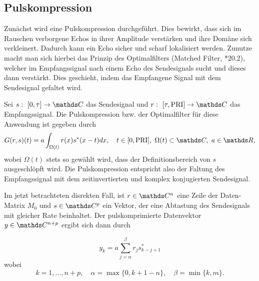 
\subsection{Pulskompression}
Zunächst wird eine Pulskompression durchgeführt. Dies bewirkt, dass sich im Rauschen verborgene Echos in ihrer Amplitude verstärken und ihre Domäne sich verkleinert. Dadurch kann ein Echo sicher und scharf lokalisiert werden. Zunutze macht man sich hierbei das Prinzip des Optimalfilters (Matched Filter, \cite{RSH}*{20.2}), welcher im Empfangssignal nach einem Echo des Sendesignals sucht und dieses dann verstärkt. Dies geschieht, indem das Empfangene Signal mit dem Sendesignal gefaltet wird.
\begin{defn}
Sei $s:~[0,\tau] \to \C$ das Sendesignal und $r:~[\tau,\text{PRI}]\to\C$ das Empfangssignal. Die Pulskompression bzw. der Optimalfilter für diese Anwendung ist gegeben durch
\begin{displaymath}
G(r,s)(t) = a \int_{\Omega(t)} r(x)s^*(x-t)dx, \quad t\in [0,\text{PRI}],~\Omega(t)\subset\C,~a\in\R,
\end{displaymath}
wobei $\Omega(t)$ stets so gewählt wird, dass der Definitionsbereich von $s$ ausgeschlöpft wird.
Die Pulskompression entspricht also der Faltung des Empfangssignal mit dem zeitinvertierten und komplex konjugierten Sendesignal.
\end{defn}

Im jetzt betrachteten disrekten Fall, ist $r\in\C^n$ eine Zeile der Daten-Matrix $M_0$ und $s\in\C^p$ ein Vektor, der eine Abtastung des Sendesignals mit gleicher Rate beinhaltet. Der pulskomprimierte Datenvektor $y\in\C^{n+p}$ ergibt sich dann durch


\begin{displaymath}
y_k = a \sum_{j = \alpha}^{\beta} r_j s^*_{k-j+1}
\end{displaymath}
wobei
\begin{displaymath}
k=1,\ldots,n+p,\quad\alpha=\max\{0,k+1-n\},\quad\beta= \min\{k,m\}.
\end{displaymath}